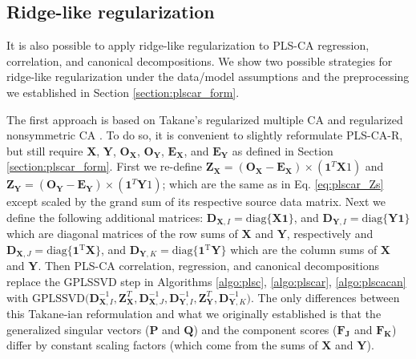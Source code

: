\documentclass[12pt]{article}
\begin{document}
\hypertarget{ridge-like-regularization}{%
\subsection{Ridge-like regularization}\label{ridge-like-regularization}}

It is also possible to apply ridge-like regularization to PLS-CA
regression, correlation, and canonical decompositions. We show two
possible strategies for ridge-like regularization under the data/model
assumptions and the preprocessing we established in Section
\ref{section:plscar_form}.

The first approach is based on Takane's regularized multiple CA
\citep{takane_regularized_2006} and regularized nonsymmetric CA
\citep{takane_regularized_2009-1}. To do so, it is convenient to
slightly reformulate PLS-CA-R, but still require \({\mathbf X}\),
\({\mathbf Y}\), \({\mathbf O}_{\mathbf X}\),
\({\mathbf O}_{\mathbf Y}\), \({\mathbf E}_{\mathbf X}\), and
\({\mathbf E}_{\mathbf Y}\) as defined in Section
\ref{section:plscar_form}. First we re-define
\({\mathbf Z}_{\mathbf X} = ({\mathbf O}_{\mathbf X} - {\mathbf E}_{\mathbf X}) \times (\mathbf{1}^{T}{\mathbf X1})\)
and
\({\mathbf Z}_{\mathbf Y} = ({\mathbf O}_{\mathbf Y} - {\mathbf E}_{\mathbf Y}) \times (\mathbf{1}^{T}{\mathbf Y1})\);
which are the same as in Eq. \ref{eq:plscar_Zs} except scaled by the
grand sum of its respective source data matrix. Next we define the
following additional matrices:
\({\mathbf D}_{{\mathbf X},I} = \mathrm{diag\{ \mathbf{X1} \}}\), and
\({\mathbf D}_{{\mathbf Y},I} = \mathrm{diag\{ \mathbf{Y1} \}}\) which
are diagonal matrices of the row sums of \({\mathbf X}\) and
\({\mathbf Y}\), respectively and
\({\mathbf D}_{{\mathbf X},J} = \mathrm{diag\{ \mathbf{1}^{T} \mathbf{X} \}}\),
and
\({\mathbf D}_{{\mathbf Y},K} = \mathrm{diag\{ \mathbf{1}^{T}\mathbf{Y} \}}\)
which are the column sums of \({\mathbf X}\) and \({\mathbf Y}\). Then
PLS-CA correlation, regression, and canonical decompositions replace the
GPLSSVD step in Algorithms \ref{algo:plsc}, \ref{algo:plscar},
\ref{algo:plscacan} with
\(\mathrm{GPLSSVD(}{\mathbf D}_{{\mathbf X},I}^{-1},{\mathbf Z}_{\mathbf X}^{T}, {\mathbf D}_{{\mathbf X},J}^{-1}, {\mathbf D}_{{\mathbf Y},I}^{-1},{\mathbf Z}_{\mathbf Y}^{T}, {\mathbf D}_{{\mathbf Y},K}^{-1} \mathrm{)}\).
The only differences between this Takane-ian reformulation and what we
originally established is that the generalized singular vectors
(\({\mathbf P}\) and \({\mathbf Q}\)) and the component scores
(\({\mathbf F}_{\mathbf J}\) and \({\mathbf F}_{\mathbf K}\)) differ by
constant scaling factors (which come from the sums of \({\mathbf X}\)
and \({\mathbf Y}\)).
\end{document}
